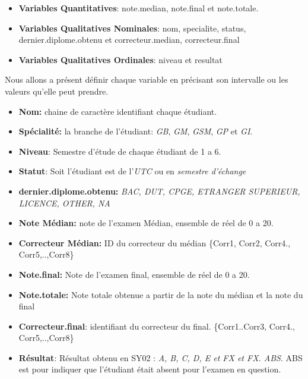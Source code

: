 \documentclass[10pt]{article}
\begin{document}
	
	\begin{itemize}
		\item \textbf{Variables Quantitatives}: note.median, note.final et  note.totale.
		\item  \textbf{Variables Qualitatives Nominales}: nom, specialite, status, dernier.diplome.obtenu et correcteur.median, correcteur.final
		\item  \textbf{Variables Qualitatives Ordinales}: niveau et resultat  \\
	\end{itemize}
	Nous allons a présent définir  chaque variable en précisant son intervalle ou les valeurs qu'elle peut prendre.
	
	\begin{itemize}
		\item \textbf{Nom:} chaine de caractère identifiant chaque étudiant.
		\item \textbf{Spécialité:} la branche de l'étudiant: \textit{GB}, \textit{GM}, \textit{GSM}, \textit{GP} et \textit{GI}.
		\item \textbf{Niveau}: Semestre d'étude de chaque étudiant de 1 a 6.
		\item \textbf{Statut}: Soit l'étudiant est de l'\textit{UTC} ou en \textit{semestre d'échange}
		\item \textbf{dernier.diplome.obtenu:}
		\textit{BAC, DUT, CPGE, ETRANGER SUPERIEUR, LICENCE, OTHER, NA}
		\item \textbf{Note Médian:} note de l'examen Médian, ensemble de réel de 0 a 20.
		\item \textbf{Correcteur Médian:} ID du correcteur du médian \{Corr1, Corr2, Corr4., Corr5,..,Corr8\}
		\item \textbf{Note.final:} Note de l'examen final, ensemble de réel de 0 a 20.
		\item \textbf{Note.totale:} Note totale obtenue a partir de la note du médian et la note du final
		\item \textbf{Correcteur.final}: identifiant  du correcteur du final. \{Corr1..Corr3, Corr4., Corr5,..,Corr8\}
		\item \textbf{Résultat}: Résultat obtenu en SY02 : \textit{A, B, C, D, E et FX et FX. ABS}. ABS est pour indiquer que l'étudiant était absent pour l'examen en question.
	\end{itemize}
	
\end{document}
